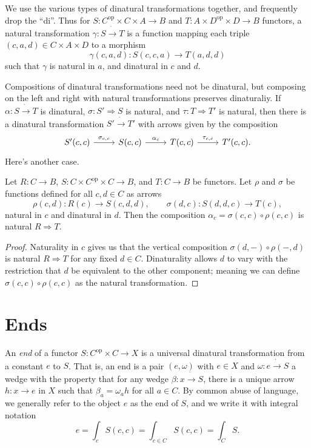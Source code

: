 We use the various types of dinatural transformations together, and frequently drop the ``di''. Thus for $S : C^{\mathrm{op} } \times C\times A \to B$ and $T : A\times D^{\mathrm{op} } \times D \to B$ functors, a natural transformation $\gamma : S \dot{\to } T$ is a function mapping each triple $(c,a,d)\in C\times A\times D$ to a morphism
\[
	\gamma(c,a,d): S(c,c,a) \to T(a,d,d)
\]
such that $\gamma$ is natural in $a$, and dinatural in $c$ and $d$.

Compositions of dinatural transformations need not be dinatural, but composing on the left and right with natural transformations preserves dinaturaliy. If $\alpha : S \dot{\to } T$ is dinatural, $\sigma : S' \Rightarrow S$ is natural, and $\tau : T \Rightarrow T'$ is natural, then there is a dinatural transformation $S' \dot{\to } T'$ with arrows given by the composition
\[\begin{tikzcd}[row sep = 2.5em, column sep = 2.5em]
S'(c,c)\ar[" \sigma_{c,c}  ", r]  & S(c,c)\ar[" \alpha_c ", r]  & T(c,c)\ar[" \tau_{c,c}  ", r]  & T'(c,c).
\end{tikzcd}\]
Here's another case.

\begin{proposition}\label{prp:9.1}
	Let $R : C \to B$, $S : C\times C^{\mathrm{op} } \times C \to B$, and $T : C \to B$ be functors. Let $\rho$ and $\sigma$ be functions defined for all $c,d\in C$ as arrows
	\[
		\rho(c,d): R(c) \to S(c,d,d),\qquad \sigma(d,c): S(d,d,c) \to T(c),
	\]
	natural in $c$ and dinatural in $d$. Then the composition $\alpha_c = \sigma(c,c)\circ \rho(c,c)$ is natural $R\Rightarrow T$.
\end{proposition}
\begin{proof}
	Naturality in $c$ gives us that the vertical composition $\sigma(d,-)\circ \rho(-,d)$ is natural $R\Rightarrow T$ for any fixed $d\in C$. Dinaturality allows $d$ to vary with the restriction that $d$ be equivalent to the other component; meaning we can define $\sigma(c,c)\circ \rho(c,c)$ as the natural transformation.
\end{proof}

\section{Ends}

\begin{definition}[End]\label{dfn:9.4}
	An \emph{end} of a functor $S : C^{\mathrm{op} } \times C \to X$ is a universal dinatural transformation from a constant $e$ to $S$. That is, an end is a pair $(e,\omega)$ with $e\in X$ and $\omega : e \dot{\to } S$ a wedge with the property that for any wedge $\beta : x \dot{\to } S$, there is a unique arrow $h : x \to e$ in $X$ such that $\beta_a = \omega_ah$ for all $a\in C$. By common abuse of language, we generally refer to the object $e$ as the end of $S$, and we write it with integral notation
	\[
		e= \int_c S(c,c) = \int_{c\in C} S(c,c) = \int_{C} S
	.\]
\end{definition}

